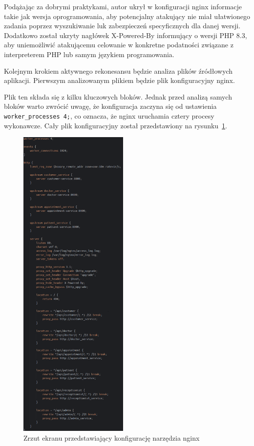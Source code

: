 \documentclass[12pt,twoside]{book}
\newcommand{\captionvspace}{\vspace{6pt}}
\begin{document}
    Podążając za dobrymi praktykami, autor ukrył w konfiguracji nginx informacje takie jak wersja oprogramowania, aby potencjalny atakujący nie miał ułatwionego zadania poprzez wyszukiwanie luk zabezpieczeń specyficznych dla danej wersji. Dodatkowo został ukryty nagłówek X-Powered-By informujący o wersji PHP 8.3, aby uniemożliwić atakującemu celowanie w konkretne podatności związane z interpreterem PHP lub samym językiem programowania.

    Kolejnym krokiem aktywnego rekonesansu będzie analiza plików źródłowych aplikacji. Pierwszym analizowanym plikiem będzie plik konfiguracyjny nginx.

    Plik ten składa się z kilku kluczowych bloków. Jednak przed analizą samych bloków warto zwrócić uwagę, że konfiguracja zaczyna się od ustawienia \texttt{worker\_processes 4;}, co oznacza, że nginx uruchamia cztery procesy wykonawcze. Cały plik konfiguracyjny został przedstawiony na rysunku~\ref{fig:nginx-config}.

    \begin{figure}[ht]
        \centering
        \includegraphics[width=0.48\textwidth]{includes/images/nginx-configuration.png}
        \captionvspace
        \caption{Zrzut ekranu przedstawiający konfigurację narzędzia nginx}
        \label{fig:nginx-config}
    \end{figure}
\end{document}
